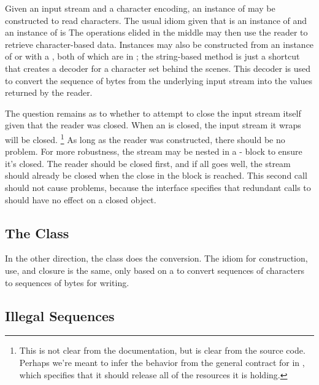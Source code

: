 Given an input stream and a character encoding, an instance of
 may be constructed to read characters.  The
usual idiom given that  is an instance of 
and  an instance of  is
%
%
The operations elided in the middle may then use the reader to
retrieve character-based data.  Instances may also be constructed from
an instance of  or with a , both of
which are in ; the string-based method is just
a shortcut that creates a decoder for a character set behind the
scenes.  This decoder is used to convert the sequence of bytes from
the underlying input stream into the  values returned by
the reader.

The question remains as to whether to attempt to close the input
stream itself given that the reader was closed.  When an
 is closed, the input stream it wraps will be
closed.%
%
\footnote{This is not clear from the documentation, but is clear from
  the source code.  Perhaps we're meant to infer the behavior from the
  general contract for  in , which
  specifies that it should release all of the resources it is holding.}
%
As long as the reader was constructed, there should be no problem.
For more robustness, the stream may be nested in a
- block to ensure it's closed.  The reader
should be closed first, and if all goes well, the stream should
already be closed when the close in the  block is
reached.  This second call should not cause problems, because the
 interface specifies that redundant calls to
 should have no effect on a closed object.

\subsection{The  Class}

In the other direction, the class  does the
conversion.  The idiom for construction, use, and closure is the same,
only based on a  to convert sequences of
characters to sequences of bytes for writing.

\subsection{Illegal Sequences}

